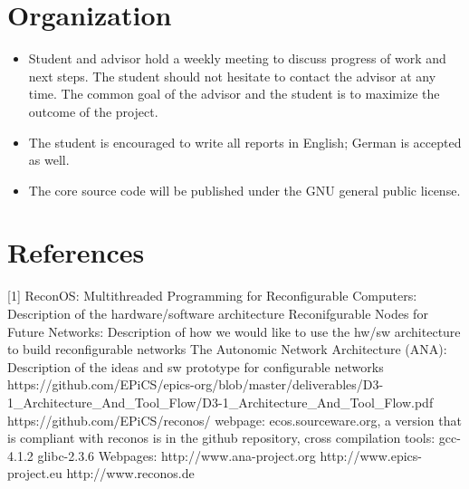 \section{Organization}
\begin{itemize}
	\item 	Student and advisor hold a weekly meeting to discuss progress of work and next steps. 
		The student should not hesitate to contact the advisor at any time. 
		The common goal of the advisor and the student is to maximize the outcome of the project.
	\item 	The student is encouraged to write all reports in English; German is accepted as well. 
    	\item	The core source code will be published under the GNU general public license.
\end{itemize}

\section{References}
[1] ReconOS: Multithreaded Programming for Reconfigurable Computers: Description of the hardware/software architecture
\newline
[2] Reconifgurable Nodes for Future Networks: Description of how we would like to use the hw/sw architecture to build reconfigurable networks
\newline
[3] The Autonomic Network Architecture (ANA): Description of the ideas and sw prototype for configurable networks
\newline
[4] https://github.com/EPiCS/epics-org/blob/master/deliverables/D3-1\_Architecture\_And\_Tool\_Flow/D3-1\_Architecture\_And\_Tool\_Flow.pdf
\newline
[5] https://github.com/EPiCS/reconos/
\newline
[6] webpage: ecos.sourceware.org, a version that is compliant with reconos is in the github repository, cross compilation tools: gcc-4.1.2 glibc-2.3.6
\newline
Webpages:
\newline
http://www.ana-project.org
\newline
http://www.epics-project.eu
\newline
http://www.reconos.de
